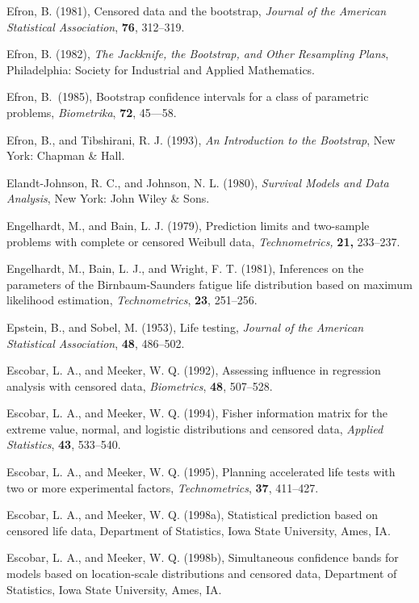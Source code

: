 \begin{thebibliography}{999}
Efron, B. (1981), Censored data and the bootstrap, {\em Journal of the
American Statistical Association}, {\bf 76}, 312--319.

Efron, B. (1982), {\em The Jackknife, the Bootstrap, and Other
Resampling Plans}, Philadelphia: Society for Industrial and Applied
Mathematics.

Efron, B.\ (1985), Bootstrap confidence intervals for a class of
parametric problems, {\em Biometrika}, {\bf 72}, 45---58.

Efron, B., and Tibshirani, R. J. (1993), {\em An Introduction to the
Bootstrap}, New York: Chapman \& Hall.

Elandt-Johnson, R. C., and Johnson, N. L. (1980), {\em Survival Models
and Data Analysis}, New York: John Wiley \& Sons.

Engelhardt, M., and Bain, L. J. (1979),
Prediction limits and two-sample problems with complete or
censored Weibull data, {\em Technometrics, } {\bf 21, }233--237.

Engelhardt, M., Bain, L. J., and Wright, F. T. (1981), Inferences on
the parameters of the Birnbaum-Saunders fatigue life distribution
based on maximum likelihood estimation, {\em Technometrics}, {\bf 23},
251--256.

Epstein, B., and Sobel, M. (1953), Life testing,  {\em Journal of
the American Statistical Association}, {\bf 48}, 486--502.

Escobar, L. A., and Meeker, W. Q. (1992), Assessing influence in
regression analysis with censored data, {\em Biometrics}, {\bf 48},
507--528.

Escobar, L. A., and Meeker, W. Q. (1994), Fisher information matrix
for the extreme value, normal, and logistic distributions and censored
data, {\em Applied Statistics}, {\bf 43}, 533--540.


Escobar, L. A., and Meeker, W. Q. (1995), Planning accelerated life
tests with two or more experimental factors, {\em Technometrics}, {\bf 37},
411--427.

Escobar, L. A., and Meeker, W. Q. (1998a), Statistical prediction
based on censored life data, Department of Statistics,
Iowa State University, Ames, IA.

Escobar, L. A., and Meeker, W. Q. (1998b), Simultaneous confidence
bands for models based on location-scale distributions and censored
data, Department of Statistics,
Iowa State University, Ames, IA.


\end{thebibliography}
